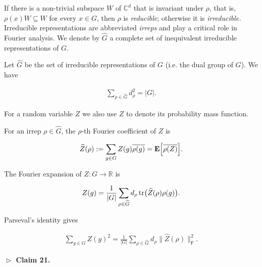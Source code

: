 \documentclass[10pt,a4paper]{article}
\begin{document}
If there is a non-trivial subspace $W$ of $\mathbb{C}^{d}$ that
is invariant under $\rho$, that is, $\rho(x)W\subseteq W$ for every
$x\in G$, then $\rho$ is \emph{reducible}; otherwise it is \emph{irreducible.}
Irreducible representations are abbreviated \emph{irreps }and play
a critical role in Fourier analysis. We denote by $\widehat{G}$ a
complete set of inequivalent irreducible representations of $G$.\par




Let $\widehat{G}$ be the set of irreducible representations of $G$ (i.e. the dual group of $G$).
We have\par


\[\begin{gathered}
\sum_{\rho\in\widehat{G}}d^{2}_{\rho}=|G|.
\end{gathered}\]




For a random variable $Z$ we also use $Z$ to denote its probability mass function.\par




For an irrep $\rho\in\widehat{G}$, the $\rho$-th Fourier coefficient of $Z$ is\par


\[\begin{gathered}
\widehat{Z}(\rho):=\sum_{g\in G}Z(g)\overline{\rho(g)}=\mathop{\bf E\/}\Bigl{[}\overline{\rho(Z)}\Bigr{]}.
\end{gathered}\]


The Fourier expansion of $Z\colon G\to\mathbb{R}$ is\par


\[\begin{gathered}
Z(g)=\frac{1}{\lvert G\rvert}\sum_{\rho\in\widehat{G}}d_{\rho}\operatorname{tr}\bigl{(}\widehat{Z}(\rho)\rho(g)\bigr{)}.
\end{gathered}\]


Parseval’s identity gives\par


\[\begin{gathered}
\sum_{g\in G}Z(g)^{2}=\frac{1}{\lvert G\rvert}\sum_{\rho\in\widehat{G}}d_{\rho}\lVert\widehat{Z}(\rho)\rVert_{\mathsf{F}}^{2}.
\end{gathered}\]





\par\medskip\noindent\textbf{
$\vartriangleright$ Claim 21. }\par
\end{document}
